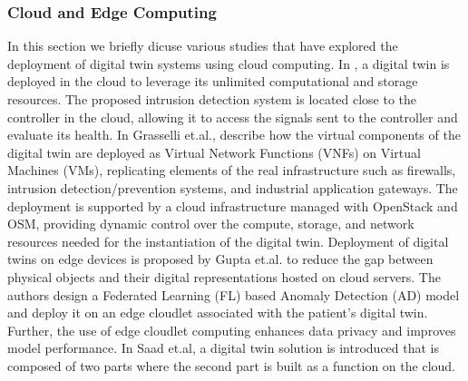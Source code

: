 \subsubsection{Cloud and Edge Computing}
In this section we briefly dicuse various studies that have explored the deployment of digital twin systems using cloud computing. In \cite{akbarianSecurityFrameworkDigital2021}, a digital twin is deployed in the cloud to leverage its unlimited computational and storage resources. The proposed intrusion detection system is located close to the controller in the cloud, allowing it to access the signals sent to the controller and evaluate its health.
In \cite{grasselliIndustrialNetworkDigital2022} Grasselli et.al., describe how the virtual components of the digital twin are deployed as Virtual Network Functions (VNFs) on Virtual Machines (VMs), replicating elements of the real infrastructure such as firewalls, intrusion detection/prevention systems, and industrial application gateways. The deployment is supported by a cloud infrastructure managed with OpenStack and OSM, providing dynamic control over the compute, storage, and network resources needed for the instantiation of the digital twin.
Deployment of digital twins on edge devices is proposed by Gupta et.al.\cite{guptaHierarchicalFederatedLearning2021} to reduce the gap between physical objects and their digital representations hosted on cloud servers. The authors design a Federated Learning (FL) based Anomaly Detection (AD) model and deploy it on an edge cloudlet associated with the patient's digital twin. Further, the use of edge cloudlet computing enhances data privacy and improves model performance.
In \cite{saadImplementationIoTBasedDigital2020} Saad et.al, a digital twin solution is introduced that is composed of two parts where the second part is built as a function on the cloud.


